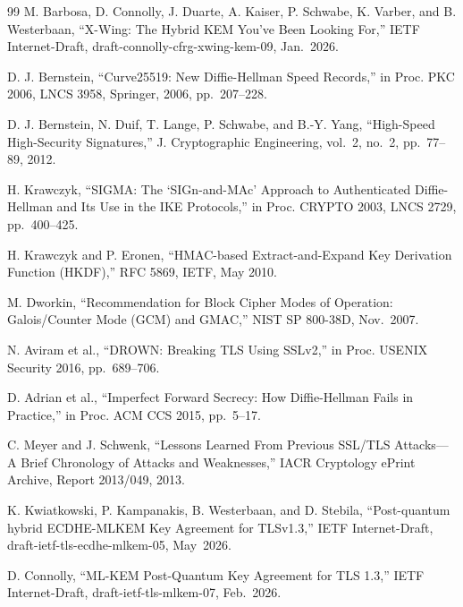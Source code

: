 \documentclass[10pt,journal,compsoc]{IEEEtran}
\begin{document}
\begin{thebibliography}{99}
 M. Barbosa, D. Connolly, J. Duarte, A. Kaiser, P. Schwabe, K. Varber, and B. Westerbaan, ``X-Wing: The Hybrid KEM You've Been Looking For,'' IETF Internet-Draft, draft-connolly-cfrg-xwing-kem-09, Jan.~2026.

 D. J. Bernstein, ``Curve25519: New Diffie-Hellman Speed Records,'' in Proc. PKC 2006, LNCS 3958, Springer, 2006, pp.~207--228.

 D. J. Bernstein, N. Duif, T. Lange, P. Schwabe, and B.-Y. Yang, ``High-Speed High-Security Signatures,'' J. Cryptographic Engineering, vol.~2, no.~2, pp.~77--89, 2012.

 H. Krawczyk, ``SIGMA: The `SIGn-and-MAc' Approach to Authenticated Diffie-Hellman and Its Use in the IKE Protocols,'' in Proc. CRYPTO 2003, LNCS 2729, pp.~400--425.

 H. Krawczyk and P. Eronen, ``HMAC-based Extract-and-Expand Key Derivation Function (HKDF),'' RFC 5869, IETF, May 2010.

 M. Dworkin, ``Recommendation for Block Cipher Modes of Operation: Galois/Counter Mode (GCM) and GMAC,'' NIST SP 800-38D, Nov.~2007.

 N. Aviram et al., ``DROWN: Breaking TLS Using SSLv2,'' in Proc. USENIX Security 2016, pp.~689--706.

 D. Adrian et al., ``Imperfect Forward Secrecy: How Diffie-Hellman Fails in Practice,'' in Proc. ACM CCS 2015, pp.~5--17.

 C. Meyer and J. Schwenk, ``Lessons Learned From Previous SSL/TLS Attacks---A Brief Chronology of Attacks and Weaknesses,'' IACR Cryptology ePrint Archive, Report 2013/049, 2013.

 K. Kwiatkowski, P. Kampanakis, B. Westerbaan, and D. Stebila, ``Post-quantum hybrid ECDHE-MLKEM Key Agreement for TLSv1.3,'' IETF Internet-Draft, draft-ietf-tls-ecdhe-mlkem-05, May~2026.

 D. Connolly, ``ML-KEM Post-Quantum Key Agreement for TLS 1.3,'' IETF Internet-Draft, draft-ietf-tls-mlkem-07, Feb.~2026.


\end{thebibliography}
\end{document}
